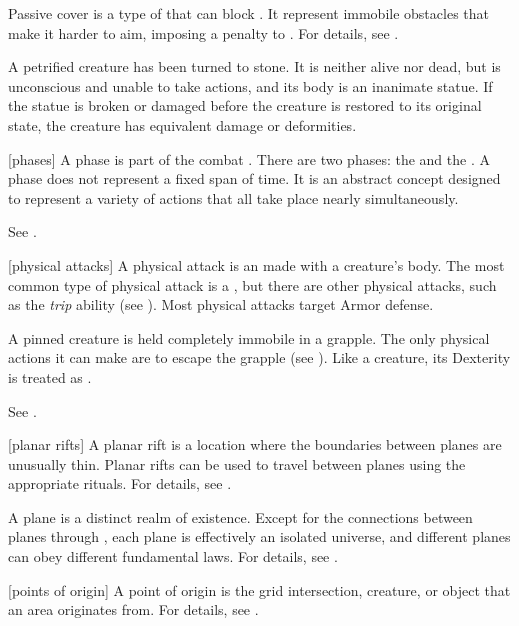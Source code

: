  Passive cover is a type of  that can block .
It represent immobile obstacles that make it harder to aim, imposing a  penalty to .
For details, see .

 A petrified creature has been turned to stone. It is neither alive nor dead, but is unconscious and unable to take actions, and its body is an inanimate statue. If the statue is broken or damaged before the creature is restored to its original state, the creature has equivalent damage or deformities.

[phases] A phase is part of the combat .
There are two phases: the  and the .
A phase does not represent a fixed span of time.
It is an abstract concept designed to represent a variety of actions that all take place nearly simultaneously.

 See .

[physical attacks] A physical attack is an  made with a creature's body.
The most common type of physical attack is a , but there are other physical attacks, such as the \textit{trip} ability (see ).
Most physical attacks target Armor defense.

 A pinned creature is held completely immobile in a grapple.
The only physical actions it can make are to escape the grapple (see ).
Like a  creature, its Dexterity is treated as .

 See .

[planar rifts] A planar rift is a location where the boundaries between planes are unusually thin.
Planar rifts can be used to travel between planes using the appropriate rituals.
For details, see \label{Planar Rifts}.

 A plane is a distinct realm of existence.
Except for the connections between planes through , each plane is effectively an isolated universe, and different planes can obey different fundamental laws.
For details, see .

[points of origin] A point of origin is the grid intersection, creature, or object that an area originates from.
For details, see .

